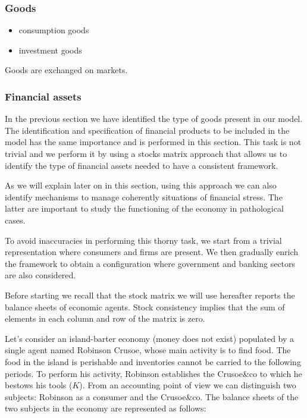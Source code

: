 \documentclass{article}
\begin{document}
\subsubsection{Goods}
\begin{itemize}
	\item consumption goods
	\item investment goods
\end{itemize}

Goods are exchanged on markets.

\subsubsection{Financial assets}

In the previous section we have identified the type of goods present in our model. The identification and specification of financial products to be included in the model has the same importance and is performed in this section. This task is not trivial and we perform it by using  
a stocks matrix approach that allows us to identify the type of financial assets needed to have a consistent framework. 

As we will explain later on in this section, using this approach we can also identify mechanisms to manage coherently situations of financial stress. The latter are important to study the functioning of the economy in pathological cases.  

To avoid inaccuracies in performing this thorny task, we start from a trivial representation where consumers and firms are present. We then gradually enrich the framework to obtain a configuration where government and banking sectors are also considered.

Before starting we recall that the stock matrix we will use hereafter reports the balance sheets of economic agents. 
Stock consistency implies that the sum of elements in each column and row of the matrix is zero.  


Let's consider an island-barter economy (money does not exist) populated by a single agent named Robinson Crusoe, whose main activity is to find food. 
The food in the island is perishable and inventories cannot be carried to the following periods. To perform his activity, Robinson establishes the Crusoe\&co to which he bestows his tools ($K$). From an accounting point of view we can distinguish two subjects: Robinson as a consumer and the Crusoe\&co. The balance sheets of the two subjects in the economy are represented as follows:
\end{document}
